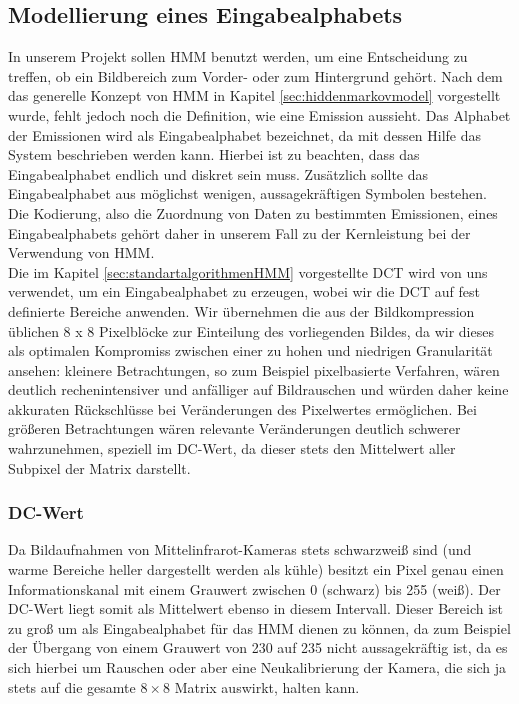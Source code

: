 \subsection{Modellierung eines Eingabealphabets}
\label{sec:modellierungeingabealphabet}
In unserem Projekt sollen HMM benutzt werden, um eine Entscheidung zu treffen, ob ein Bildbereich zum Vorder- oder zum Hintergrund gehört.
Nach dem das generelle Konzept von HMM in Kapitel \ref{sec:hiddenmarkovmodel} vorgestellt wurde, fehlt jedoch noch die Definition, wie eine Emission aussieht.
Das Alphabet der Emissionen wird als Eingabealphabet bezeichnet, da mit dessen Hilfe das System beschrieben werden kann.
Hierbei ist zu beachten, dass das Eingabealphabet endlich und diskret sein muss.
Zusätzlich sollte das Eingabealphabet aus möglichst wenigen, aussagekräftigen Symbolen bestehen.
Die Kodierung, also die Zuordnung von Daten zu bestimmten Emissionen,  eines Eingabealphabets gehört daher in unserem Fall zu der Kernleistung bei der Verwendung von HMM.\\
Die im Kapitel \ref{sec:standartalgorithmenHMM} vorgestellte DCT wird von uns verwendet, um ein Eingabealphabet zu erzeugen, wobei wir die DCT auf fest definierte Bereiche anwenden.
Wir übernehmen die aus der Bildkompression üblichen 8 x 8 Pixelblöcke zur Einteilung des vorliegenden Bildes, da wir dieses als optimalen Kompromiss zwischen einer zu hohen und niedrigen Granularität ansehen: kleinere Betrachtungen, so zum Beispiel pixelbasierte Verfahren, wären deutlich rechenintensiver und anfälliger auf Bildrauschen und würden daher keine akkuraten Rückschlüsse bei Veränderungen des Pixelwertes ermöglichen.
Bei größeren Betrachtungen wären relevante Veränderungen deutlich schwerer wahrzunehmen, speziell im DC-Wert, da dieser stets den Mittelwert aller Subpixel der Matrix darstellt.

\subsubsection{DC-Wert}
\label{sec:dc-wert}

Da Bildaufnahmen von Mittelinfrarot-Kameras stets schwarzweiß sind (und warme Bereiche heller dargestellt werden als kühle) besitzt ein Pixel genau einen Informationskanal mit einem Grauwert zwischen 0 (schwarz) bis 255 (weiß).
Der DC-Wert liegt somit als Mittelwert ebenso in diesem Intervall.
Dieser Bereich ist zu groß um als Eingabealphabet für das HMM dienen zu können, da zum Beispiel der Übergang von einem Grauwert von 230 auf 235 nicht aussagekräftig ist, da es sich hierbei um Rauschen oder aber eine Neukalibrierung der Kamera, die sich ja stets auf die gesamte $8 \times 8$ Matrix auswirkt, halten kann.\\

